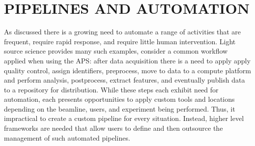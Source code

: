 \documentclass{aip-cp}
\begin{document}
\section{PIPELINES AND AUTOMATION}

As discussed there is a growing need to automate a range
of activities that are frequent, require rapid response, 
and require little human intervention. Light source 
science provides many such examples, consider a common
workflow applied when using the APS:  after data acquisition
there is a need to apply apply quality control, assign identifiers, 
preprocess, move to data to a compute platform and perform analysis, postprocess, extract 
features, and eventually publish data to a repository for distribution. 
While these steps each exhibit need for automation, each
presents opportunities to apply custom tools and locations depending on the beamline, users, and 
experiment being performed. Thus, it impractical to create a custom pipeline for every 
situation. Instead, higher level frameworks are needed that allow users to define
and then outsource the management of such automated pipelines. 

\end{document}

